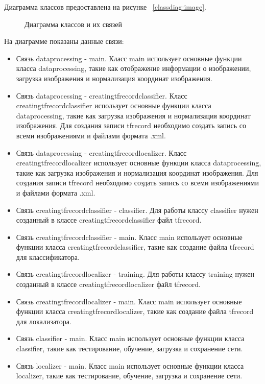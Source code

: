 Диаграмма классов предоставлена на рисунке ~\ref{classdiag:image}.

\begin{figure}[H]
\caption{Диаграмма классов и их связей}
\label{diagclass:image}
\end{figure}

На диаграмме показаны данные связи:
\begin{itemize}
	\item Связь dataprocessing - main. Класс main использует основные функции класса dataprocessing, такие как отображение информации о изображении, загрузка изображения и нормализация координат изображения.
	\item Связь dataprocessing - creatingtfrecordclassifier. Класс creatingtfrecordclassifier использует основные функции класса dataprocessing, такие как загрузка изображения и нормализация координат изображения. Для создания записи tfrecord необходимо создать запись со всеми изображениями и файлами формата .xml.
	\item Связь dataprocessing - creatingtfrecordlocalizer. Класс creatingtfrecordlocalizer использует основные функции класса dataprocessing, такие как загрузка изображения и нормализация координат изображения. Для создания записи tfrecord необходимо создать запись со всеми изображениями и файлами формата .xml.
	\item Связь creatingtfrecordclassifier - classifier. Для работы классу classifier нужен созданный в классе creatingtfrecordclassifier файл tfrecord.
	\item Связь creatingtfrecordclassifier - main.  Класс main использует основные функции класса creatingtfrecordclassifier, такие как создание файла tfrecord для классификатора.
	\item Связь creatingtfrecordlocalizer - training. Для работы классу training нужен созданный в классе creatingtfrecordlocalizer файл tfrecord.
	\item Связь creatingtfrecordlocalizer - main.  Класс main использует основные функции класса creatingtfrecordlocalizer, такие как создание файла tfrecord для локализатора.
	\item Связь classifier - main. Класс main использует основные функции класса classifier, такие как тестирование, обучение, загрузка и сохранение сети.
	\item Связь localizer - main. Класс main использует основные функции класса localizer, такие как тестирование, обучение, загрузка и сохранение сети.
\end{itemize}



